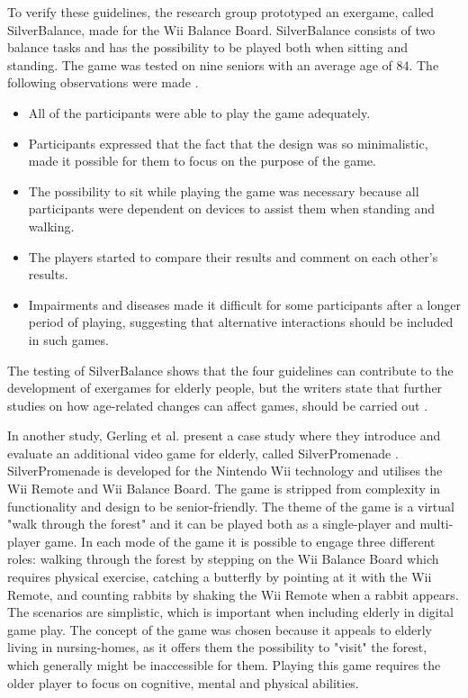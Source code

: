 To verify these guidelines, the research group prototyped an exergame, called SilverBalance, made for the Wii Balance Board. SilverBalance consists of two balance tasks and has the possibility to be played both when sitting and standing. The game was tested on nine seniors with an average age of 84. The following observations were made \cite{gerling1}.
\begin{itemize}
\item All of the participants were able to play the game adequately. 
\item Participants expressed that the fact that the design was so minimalistic, made it possible for them to focus on the purpose of the game. 
\item The possibility to sit while playing the game was necessary because all participants were dependent on devices to assist them when standing and walking.
\item The players started to compare their results and comment on each other's results.
\item Impairments and diseases made it difficult for some participants after a longer period of playing, suggesting that alternative interactions should be included in such games.
\end{itemize}

The testing of SilverBalance shows that the four guidelines can contribute to the development of exergames for elderly people, but the writers state that further studies on how age-related changes can affect games, should be carried out \cite{gerling1}.

In another study, Gerling et al. present a case study where they introduce and evaluate an additional video game for elderly, called SilverPromenade \cite{gerling2}.  SilverPromenade is developed for the Nintendo Wii technology and utilises the Wii Remote and Wii Balance Board. The game is stripped from complexity in functionality and design to be senior-friendly. The theme of the game is a virtual "walk through the forest" and it can be played both as a single-player and multi-player game. In each mode of the game it is possible to engage three different roles: walking through the forest by stepping on the Wii Balance Board which requires physical exercise, catching a butterfly by pointing at it with the Wii Remote, and counting rabbits by shaking the Wii Remote when a rabbit appears. The scenarios are simplistic, which is important when including elderly in digital game play. The concept of the game was chosen because it appeals to elderly living in nursing-homes, as it offers them the possibility to "visit" the forest, which generally might be inaccessible for them. Playing this game requires the older player to focus on cognitive, mental and physical abilities. 

